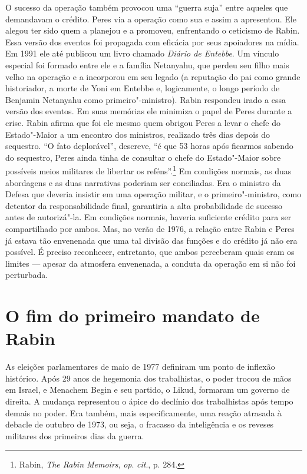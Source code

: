O sucesso da operação também provocou uma ``guerra suja'' entre aqueles
que demandavam o crédito. Peres via a operação como sua e assim a
apresentou. Ele alegou ter sido quem a planejou e a promoveu,
enfrentando o ceticismo de Rabin. Essa versão dos eventos foi propagada
com eficácia por seus apoiadores na mídia. Em 1991 ele até publicou um
livro chamado \emph{Diário de Entebbe}. Um vínculo especial foi formado
entre ele e a família Netanyahu, que perdeu seu filho mais velho na
operação e a incorporou em seu legado (a reputação do pai como grande
historiador, a morte de Yoni em Entebbe e, logicamente, o longo período
de Benjamin Netanyahu como primeiro"-ministro). Rabin respondeu irado a
essa versão dos eventos. Em suas memórias ele minimiza o papel de Peres
durante a crise. Rabin afirma que foi ele mesmo quem obrigou Peres a levar o
chefe do Estado"-Maior a um encontro dos ministros, realizado três dias
depois do sequestro. ``O fato deplorável'', descreve, ``é que 53
horas após ficarmos sabendo do sequestro, Peres ainda tinha de
consultar o chefe do Estado"-Maior sobre possíveis meios militares de
libertar os reféns''.\footnote{Rabin, \emph{The Rabin Memoirs},
\emph{op}. \emph{cit}., p. 284.} Em condições normais, as duas
abordagens e as duas narrativas poderiam ser conciliadas. Era o ministro
da Defesa que deveria insistir em uma operação militar, e o primeiro"-ministro,
como detentor da responsabilidade final, garantiria a alta
probabilidade de sucesso antes de autorizá"-la. Em condições normais,
haveria suficiente crédito para ser compartilhado por ambos. Mas, no
verão de 1976, a relação entre Rabin e Peres já estava tão envenenada que
uma tal divisão das funções e do crédito já não era possível. É preciso
reconhecer, entretanto, que ambos perceberam quais eram os limites ---
apesar da atmosfera envenenada, a conduta da operação em si não foi
perturbada.

\section{O fim do primeiro mandato de Rabin}

As eleições parlamentares de maio de 1977 definiram um ponto de inflexão
histórico. Após 29 anos de hegemonia dos trabalhistas, o poder
trocou de mãos em Israel, e Menachem Begin e seu partido, o Likud,
formaram um governo de direita. A mudança representou o ápice do
declínio dos trabalhistas após tempo demais no poder. Era também, mais
especificamente, uma reação atrasada à debacle de outubro de 1973, ou
seja, o fracasso da inteligência e os reveses militares dos primeiros
dias da guerra.

